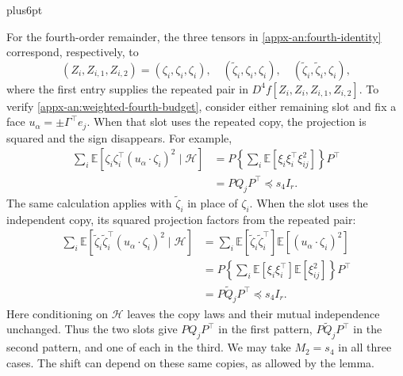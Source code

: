 \documentclass[11pt,letterpaper,twoside,leqno]{article}
\makeatletter
\theoremstyle{bookplain}
\theoremstyle{bookremark}
\renewenvironment{proof}[1][\proofname]{\par
  \pushQED{\qed}\normalfont\topsep6pt plus6pt\relax
  \trivlist\item[\hskip\labelsep\bfseries #1\@addpunct{.}]\ignorespaces
}{\popQED\endtrivlist\@endpefalse}
\newcommand{\E}{\mathbb E}
\makeatother
\begin{document}
\begin{proof}[Proof of the seeded estimates~\eqref{eq:seeded-derivatives}]
For the fourth-order remainder, the three tensors in
\eqref{appx-an:fourth-identity} correspond, respectively, to
\[
 (Z_i,Z_{i,1},Z_{i,2})
 =(\zeta_i,\zeta_i,\zeta_i),\quad
  (\widetilde\zeta_i,\zeta_i,\zeta_i),\quad
  (\widetilde\zeta_i,\widetilde\zeta_i,\zeta_i),
\]
where the first entry supplies the repeated pair in
$D^4f[Z_i,Z_i,Z_{i,1},Z_{i,2}]$. To verify
\eqref{appx-an:weighted-fourth-budget}, consider either remaining
slot and fix a face $u_\alpha=\pm\Gamma^\top e_j$.
When that slot uses the repeated copy, the projection is squared
and the sign disappears. For example,
\[
 \begin{aligned}
 \sum_i\E[\zeta_i\zeta_i^\top
                  (u_\alpha\cdot\zeta_i)^2\mid\mathcal H]
 &=P\left\{\sum_i\E[\xi_i\xi_i^\top\xi_{ij}^2]\right\}P^\top\\
 &=PQ_jP^\top\preceq s_4I_r.
 \end{aligned}
\]
The same calculation applies with $\widetilde\zeta_i$ in place
of $\zeta_i$. When the slot uses the independent copy, its
squared projection factors from the repeated pair:
\[
 \begin{aligned}
 \sum_i\E[\widetilde\zeta_i\widetilde\zeta_i^\top
                  (u_\alpha\cdot\zeta_i)^2\mid\mathcal H]
 &=\sum_i\E[\widetilde\zeta_i\widetilde\zeta_i^\top]
                   \E[(u_\alpha\cdot\zeta_i)^2]\\
 &=P\left\{\sum_i\E[\xi_i\xi_i^\top]\E[\xi_{ij}^2]\right\}P^\top\\
 &=P\widetilde Q_jP^\top\preceq s_4I_r.
 \end{aligned}
\]
Here conditioning on $\mathcal H$ leaves the copy laws and
their mutual independence unchanged. Thus the two slots give
$PQ_jP^\top$ in the first pattern,
$P\widetilde Q_jP^\top$ in the second pattern, and one of each
in the third. We may take $M_2=s_4$ in all three cases. The
shift can depend on these same copies, as allowed by the lemma.


\end{proof}
\end{document}
